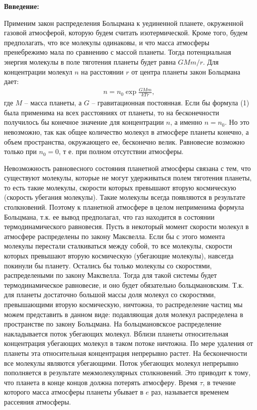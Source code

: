 \documentclass{letask}
\begin{document}


\textbf{Ввведение:} 

\parindent=0.5cm Применим закон распределения Больцмана к уединенной планете, окруженной газовой атмосферой, которую будем считать изотермической. Кроме того, будем предполагать, что все молекулы одинаковы, и что масса атмосферы пренебрежимо мала по сравнению с массой планеты. Тогда потенциальная энергия молекулы в поле тяготения планеты будет равна $GMm/r$. Для концентрации молекул $n$ на расстоянии $r$ от центра планеты закон Больцмана дает:
		\begin{gather}
			n=n_0\exp \frac{GMm}{kTr},
		\end{gather}
где $M$ -- масса планеты, а $G$ -- гравитационная постоянная. Если бы формула (1) была применима на всех расстояниях от планеты, то на бесконечности получилось бы конечное значение для концентрации $n$, а именно $n = n_0$. Но это невозможно, так как общее количество молекул в атмосфере планеты конечно, а объем пространства, окружающего ее, бесконечно велик. Равновесие возможно только при $n_0 = 0$, т е. при полном отсутствии атмосферы. 

\parindent=0.5cm Невозможность равновесного состояния планетной атмосферы связана с тем, что существуют молекулы, которые не могут удерживаться полем тяготения планеты, то есть такие молекулы, скорости которых превышают вторую космическую (скорость убегания молекулы). Такие молекулы всегда появляются в результате столкновений. Поэтому к планетной атмосфере в целом неприменима формула Больцмана, т.к. ее вывод предполагал, что газ находится в состоянии термодинамического равновесия. Пусть в некоторый момент скорости молекул в атмосфере распределены по закону Максвелла. Если бы с этого момента молекулы перестали сталкиваться между собой, то все молекулы, скорости которых превышают вторую космическую (убегающие молекулы), навсегда покинули бы планету. Остались бы только молекулы со скоростями, распределеными по закону Максвелла. Тогда для такой системы будет термодинамическое равновесие, и оно будет обязательно больцмановским. Т.к. для планеты достаточно большой массы доля молекул со скоростями, превышающими вторую космическую, ничтожна, то распределение частиц мы можем представить в данном виде: подавляющая доля молекул распределена в пространстве по закону Больцмана. На больцмановсксое распределение накладывается поток убегающих молекул. Вблизи планеты относительная концентрация убегающих молекул в таком потоке ничтожна. По мере удаления от планеты эта относительная концентрация непрерывно растет. На бесконечности все молекулы являются убегающими. Поток убегающих молекул непрерывно пополняется в результате межмолекулярных столкновений. Это приводит к тому, что планета в конце концов должна потерять атмосферу. Время $\tau$, в течение которого масса атмосферы планеты убывает в $e$ раз, называется временем рассеяния атмосферы.
\end{document}
